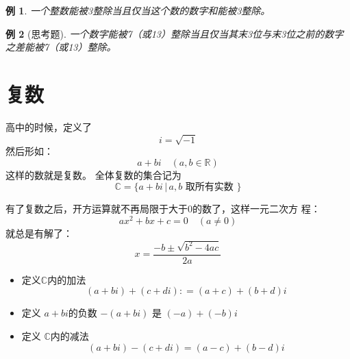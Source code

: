 \documentclass[13pt,fontset=mac]{ctexbeamer}
\newtheorem{exa}{例}
\begin{document}
\begin{frame}
	\begin{exa}
一个整数能被3整除当且仅当这个数的数字和能被3整除。
	\end{exa}

\begin{exa}[思考题]
一个数字能被7（或13）整除当且仅当其末3位与末3位之前的数字之差能被7（或13）整除。
\end{exa}


\end{frame}


%




\section{复数}
\begin{frame}
	高中的时候，定义了
	\[
	i=\sqrt{-1}
	\]
	然后形如：
	\[
	a+b i \quad(a, b \in \mathbb{R})
	\]
	这样的数就是复数。
	全体复数的集合记为
	\[
	\mathbb{C}=\{a+b i \, | \, a, b \text { 取所有实数 }\}
	\]


	有了复数之后，开方运算就不再局限于大于0的数了，这样一元二次方 程：
	\[
	a x^{2}+b x+c=0 \quad(a \neq 0)
	\]
	就总是有解了：
	\[
	x=\frac{-b \pm \sqrt{b^{2}-4 a c}}{2 a}
	\]


\end{frame}

\begin{frame}
	\begin{itemize}
		\item 定义$\mathbb{C}$内的加法
		$$(a+b i)+(c+d i)  : =(a+c)+(b+d) i $$

		\item 定义 $a+b {i}$的负数 $-(a+b {i})${ 是 } $(-a)+(-b) {i}$

		\item 定义  $\mathbb{C}$内的减法 $$(a+b i)-(c+d i) =(a-c)+(b-d) i $$
	\end{itemize}

\end{frame}
\end{document}
